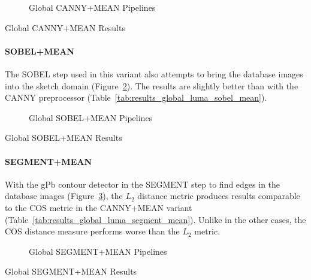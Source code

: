 \begin{figure}[h]
    \centering
    
    \caption[Global CANNY+MEAN Pipelines]{
        Global CANNY+MEAN Pipelines
    }
    \label{fig:pipeline_global_luma_canny_mean}
\end{figure}

\begin{table}[h]
    \centering
    
    \caption[Global CANNY+MEAN Results]{
        Global CANNY+MEAN Results
    }
    \label{tab:results_global_luma_canny_mean}
\end{table}

\FloatBarrier
\paragraph{SOBEL+MEAN}

The SOBEL step used in this variant also attempts to bring the database images
into the sketch domain (Figure~\ref{fig:pipeline_global_luma_sobel_mean}). The
results are slightly better than with the CANNY preprocessor
(Table~\ref{tab:results_global_luma_sobel_mean}).

\begin{figure}[h!]
    \centering
    
    \caption[Global SOBEL+MEAN Pipelines]{
        Global SOBEL+MEAN Pipelines
    }
    \label{fig:pipeline_global_luma_sobel_mean}
\end{figure}

\begin{table}[h!]
    \centering
    
    \caption[Global SOBEL+MEAN Results]{
        Global SOBEL+MEAN Results
    }
    \label{tab:results_global_luma_sobel_mean}
\end{table}

\FloatBarrier
\paragraph{SEGMENT+MEAN}

With the gPb contour detector in the SEGMENT step to find edges in the database
images (Figure~\ref{fig:pipeline_global_luma_segment_mean}), the $L_2$ distance
metric produces results comparable to the COS metric in the CANNY+MEAN variant
(Table~\ref{tab:results_global_luma_segment_mean}).  Unlike in the other cases,
the COS distance measure performs worse than the $L_2$ metric.

\begin{figure}[h]
    \centering
    
    \caption[Global SEGMENT+MEAN Pipelines]{
        Global SEGMENT+MEAN Pipelines
    }
    \label{fig:pipeline_global_luma_segment_mean}
\end{figure}

\begin{table}[h]
    \centering
    
    \caption[Global SEGMENT+MEAN Results]{
        Global SEGMENT+MEAN Results
    }
    \label{tab:results_global_luma_segment_mean}
\end{table}

\FloatBarrier
